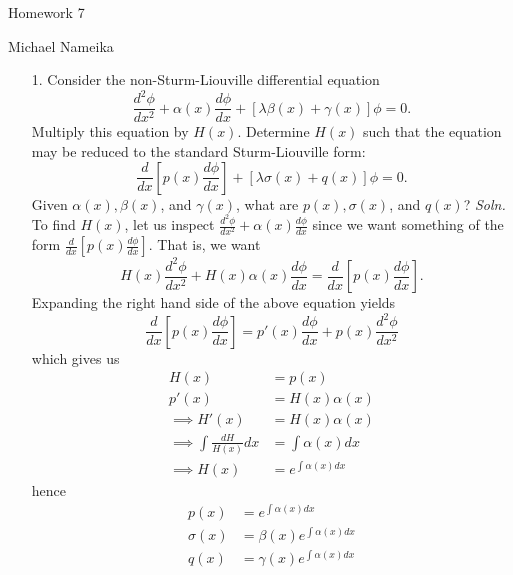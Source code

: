 \documentclass{article}
\begin{document}
\begin{center}
    {\Huge Homework 7}
    \vspace{0.5cm}

    {\Large Michael Nameika}
\end{center}
\begin{itemize}
    \item[1.] Consider the non-Sturm-Liouville differential equation
    \[\frac{d^2\phi}{dx^2} + \alpha(x)\frac{d\phi}{dx} + [\lambda \beta(x) + \gamma(x)]\phi = 0.\]
    Multiply this equation by $H(x)$. Determine $H(x)$ such that the equation may be reduced to the standard Sturm-Liouville form:
    \[\frac{d}{dx}\left[p(x)\frac{d\phi}{dx}\right] + [\lambda \sigma(x) + q(x)]\phi = 0.\]
    Given $\alpha(x), \beta(x)$, and $\gamma(x)$, what are $p(x), \sigma(x)$, and $q(x)$?
    \newline\newline
    \textit{Soln.} To find $H(x)$, let us inspect $\frac{d^2\phi}{dx^2} + \alpha(x)\frac{d\phi}{dx}$ since we want something of the form $\frac{d}{dx}[p(x)\frac{d\phi}{dx}]$. That is, we want
    \[H(x)\frac{d^2\phi}{dx^2} + H(x)\alpha(x)\frac{d\phi}{dx} = \frac{d}{dx}\left[p(x)\frac{d\phi}{dx}\right].\]
    Expanding the right hand side of the above equation yields
    \[\frac{d}{dx}\left[p(x)\frac{d\phi}{dx}\right] = p'(x)\frac{d\phi}{dx} + p(x)\frac{d^2\phi}{dx^2}\]
    which gives us
    \begin{align*}
        H(x) &= p(x)\\
        p'(x) &= H(x)\alpha(x)\\
        \implies H'(x) &= H(x)\alpha(x)\\
        \implies \int\frac{dH}{H(x)}dx &= \int\alpha(x)dx\\
        \implies H(x) &= e^{\int\alpha(x)dx}
    \end{align*}
    hence
    \begin{align*}
        p(x) &= e^{\int \alpha(x) dx}\\
        \sigma(x) &= \beta(x) e^{\int\alpha(x)dx}\\
        q(x) &= \gamma(x) e^{\int\alpha(x)dx}
    \end{align*}
    \pagebreak


\end{itemize}
\end{document}

